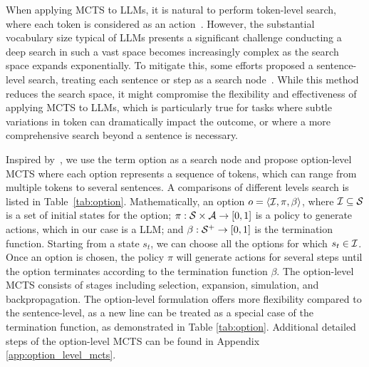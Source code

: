 
When applying MCTS to LLMs, it is natural to perform token-level search, where each token is considered as an action~\citep{liu2023making}. However, the substantial vocabulary size typical of LLMs presents a significant challenge \ie conducting a deep search in such a vast space becomes increasingly complex as the search space expands exponentially. To mitigate this, some efforts proposed a sentence-level search, treating each sentence or step as a search node~\citep{feng2023alphazero}. While this method reduces the search space, it might compromise the flexibility and effectiveness of applying MCTS to LLMs, which is particularly true for tasks where subtle variations in token can dramatically impact the outcome, or where a more comprehensive search beyond a sentence is necessary.

Inspired by~\cite{option_mcts, de2016monte}, we use the term option as a search node and propose option-level MCTS where each option represents a sequence of tokens, which can range from multiple tokens to several sentences. A comparisons of different levels search is listed in Table~\ref{tab:option}. Mathematically, an option $o = \langle {\mathcal{I}}, \pi, \beta \rangle$, where ${\mathcal{I}} \subseteq {\mathcal{S}}$ is a set of initial states for the option; $\pi: {\mathcal{S}} \times {\mathcal{A}} \rightarrow [0,1]$ is a policy to generate actions, which in our case is a LLM; and $\beta: {\mathcal{S}}^{+} \rightarrow [0,1]$ is the termination function. Starting from a state $s_t$, we can choose all the options for which $s_t \in {\mathcal{I}}$. Once an option is chosen, the policy $\pi$ will generate actions for several steps until the option terminates according to the termination function $\beta$. The option-level MCTS consists of stages including selection, expansion, simulation, and backpropagation. The option-level formulation offers more flexibility compared to the sentence-level, as a new line can be treated as a special case of the termination function, as demonstrated in Table \ref{tab:option}. Additional detailed steps of the option-level MCTS can be found in Appendix \ref{app:option_level_mcts}.

